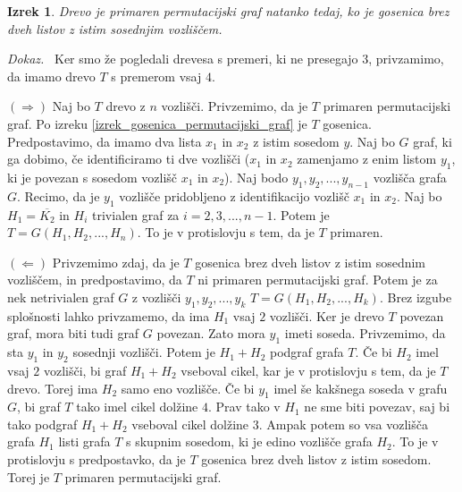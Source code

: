 \documentclass[a4paper, 12pt]{book}
\newtheorem{izrek}{Izrek}[chapter]
\newenvironment{dokaz}{\emph{Dokaz.}\ }{\hspace{\fill}{$\Box$}}
\begin{document}
\begin{izrek}
    Drevo je primaren permutacijski graf natanko tedaj, ko je gosenica brez dveh listov z istim sosednjim vozliščem.
\end{izrek}
\begin{dokaz}
    Ker smo že pogledali drevesa s premeri, ki ne presegajo $3$, privzamimo, da imamo drevo $T$ s premerom vsaj $4$. 
    
    $(\Rightarrow)$ Naj bo $T$ drevo z $n$ vozlišči. Privzemimo, da je $T$ primaren permutacijski graf. Po izreku \ref{izrek_gosenica_permutacijski_graf} je $T$ gosenica. Predpostavimo, da imamo dva lista $x_1$ in $x_2$ z istim sosedom $y$. Naj bo $G$ graf, ki ga dobimo, če identificiramo ti dve vozlišči ($x_1$ in $x_2$ zamenjamo z enim listom $y_1$, ki je povezan s sosedom vozlišč $x_1$ in $x_2$). Naj bodo $y_1, y_2, ..., y_{n-1}$ vozlišča grafa $G$. Recimo, da je $y_1$ vozlišče pridobljeno z identifikacijo vozlišč $x_1$ in $x_2$. Naj bo $H_1 = \overline{K_2}$ in $H_i$ trivialen graf za $i = 2, 3, ..., n-1$. Potem je $T = G(H_1, H_2, ..., H_n)$. To je v protislovju s tem, da je $T$ primaren. 
    
    $(\Leftarrow)$ Privzemimo zdaj, da je $T$ gosenica brez dveh listov z istim sosednim vozliščem, in predpostavimo, da $T$ ni primaren permutacijski graf. Potem je za nek netrivialen graf $G$ z vozlišči $y_1, y_2, ..., y_k$ $T = G(H_1, H_2, ..., H_k)$. Brez izgube splošnosti lahko privzamemo, da ima $H_1$ vsaj $2$ vozlišči. Ker je drevo $T$ povezan graf, mora biti tudi graf $G$ povezan. Zato mora $y_1$ imeti soseda. Privzemimo, da sta $y_1$ in $y_2$ sosednji vozlišči. Potem je $H_1 + H_2$ podgraf grafa $T$. Če bi $H_2$ imel vsaj $2$ vozlišči, bi graf $H_1 + H_2$ vseboval cikel, kar je v protislovju s tem, da je $T$ drevo. Torej ima $H_2$ samo eno vozlišče. Če bi $y_1$ imel še kakšnega soseda v grafu $G$, bi graf $T$ tako imel cikel dolžine $4$. Prav tako v $H_1$ ne sme biti povezav, saj bi tako podgraf $H_1 + H_2$ vseboval cikel dolžine $3$. Ampak potem so vsa vozlišča grafa $H_1$ listi grafa $T$ s skupnim sosedom, ki je edino vozlišče grafa $H_2$. To je v protislovju s predpostavko, da je $T$ gosenica brez dveh listov z istim sosedom. Torej je $T$ primaren permutacijski graf.
\end{dokaz}
\end{document}

